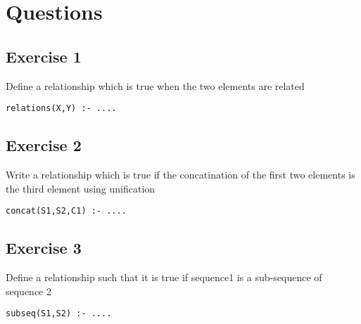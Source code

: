 \documentclass{article}
\begin{document}
\section{Questions}

\subsection{Exercise 1}

Define a relationship which is true when the two elements are related
\begin{verbatim}
relations(X,Y) :- ....
\end{verbatim}

\subsection{Exercise 2}

Write a relationship which is true if the concatination of the first two
elements is the third element using unification
\begin{verbatim}
concat(S1,S2,C1) :- ....
\end{verbatim}

\subsection{Exercise 3}

Define a relationship such that it is true if sequence1 is a sub-sequence of
sequence 2
\begin{verbatim}
subseq(S1,S2) :- ....
\end{verbatim}
\end{document}
